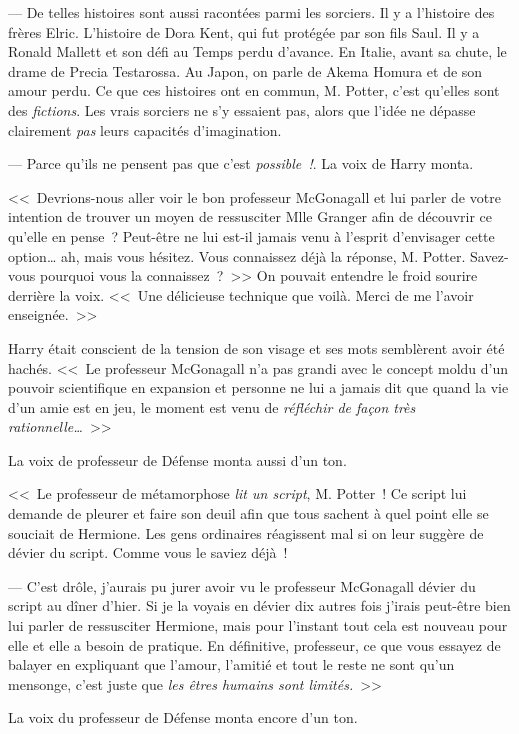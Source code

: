 --- De telles histoires sont aussi racontées parmi les sorciers. Il y a l'histoire des frères Elric. L'histoire de Dora Kent, qui fut protégée par son fils Saul. Il y a Ronald Mallett et son défi au Temps perdu d'avance. En Italie, avant sa chute, le drame de Precia Testarossa. Au Japon, on parle de Akema Homura et de son amour perdu. Ce que ces histoires ont en commun, M. Potter, c'est qu'elles sont des \emph{fictions}. Les vrais sorciers ne s'y essaient pas, alors que l'idée ne dépasse clairement \emph{pas} leurs capacités d'imagination.

--- Parce qu'ils ne pensent pas que c'est \emph{possible~!}. La voix de Harry monta.

<<~Devrions-nous aller voir le bon professeur McGonagall et lui parler de votre intention de trouver un moyen de ressusciter Mlle Granger afin de découvrir ce qu'elle en pense~? Peut-être ne lui est-il jamais venu à l'esprit d'envisager cette option… ah, mais vous hésitez. Vous connaissez déjà la réponse, M. Potter. Savez-vous pourquoi vous la connaissez~?~>> On pouvait entendre le froid sourire derrière la voix. <<~Une délicieuse technique que voilà. Merci de me l'avoir enseignée.~>>

Harry était conscient de la tension de son visage et ses mots semblèrent avoir été hachés. <<~Le professeur McGonagall n'a pas grandi avec le concept moldu d'un pouvoir scientifique en expansion et personne ne lui a jamais dit que quand la vie d'un amie est en jeu, le moment est venu de \emph{réfléchir de façon très rationnelle…}~>>

La voix de professeur de Défense monta aussi d'un ton.

<<~Le professeur de métamorphose \emph{lit un script}, M. Potter~! Ce script lui demande de pleurer et faire son deuil afin que tous sachent à quel point elle se souciait de Hermione. Les gens ordinaires réagissent mal si on leur suggère de dévier du script. Comme vous le saviez déjà~!

--- C'est drôle, j'aurais pu jurer avoir vu le professeur McGonagall dévier du script au dîner d'hier. Si je la voyais en dévier dix autres fois j'irais peut-être bien lui parler de ressusciter Hermione, mais pour l'instant tout cela est nouveau pour elle et elle a besoin de pratique. En définitive, professeur, ce que vous essayez de balayer en expliquant que l'amour, l'amitié et tout le reste ne sont qu'un mensonge, c'est juste que \emph{les êtres humains sont limités.}~>>

La voix du professeur de Défense monta encore d'un ton.

